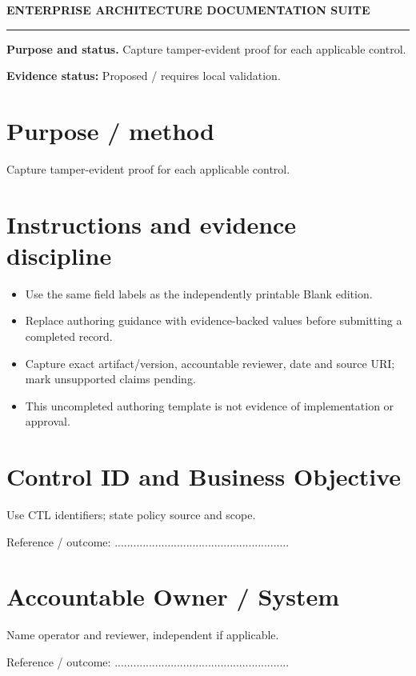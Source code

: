 \documentclass[10pt,letterpaper]{article}
\begin{document}
\begin{center}
{\large\bfseries\color{teal} ENTERPRISE ARCHITECTURE DOCUMENTATION SUITE}\par
{}\par
{}\par
\end{center}
\vspace{8pt}\hrule\vspace{12pt}
\textbf{Purpose and status.} Capture tamper-evident proof for each applicable control.\par
\textbf{Evidence status:} Proposed / requires local validation.\par
\section{Purpose / method}
Capture tamper-evident proof for each applicable control.\par
\section{Instructions and evidence discipline}
\begin{itemize}
\item Use the same field labels as the independently printable Blank edition.
\item Replace authoring guidance with evidence-backed values before submitting a completed record.
\item Capture exact artifact/version, accountable reviewer, date and source URI; mark unsupported claims pending.
\item This uncompleted authoring template is not evidence of implementation or approval.
\end{itemize}
\section{Control ID and Business Objective}
Use CTL identifiers; state policy source and scope.\par
Reference / outcome: ........................................................\par
\section{Accountable Owner / System}
Name operator and reviewer, independent if applicable.\par
Reference / outcome: ........................................................\par
\end{document}
